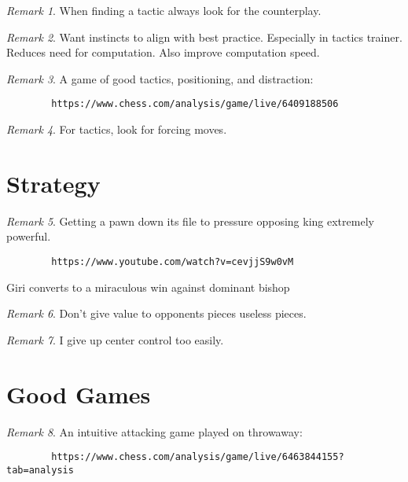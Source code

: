\documentclass[11pt]{article}
\theoremstyle{remark}
\newtheorem{remark}{Remark}
\begin{document}
\begin{remark}
	When finding a tactic always look for the counterplay.
\end{remark}

\begin{remark}
	Want instincts to align with best practice. Especially in tactics trainer. Reduces need for computation. Also improve computation speed.
\end{remark}

\begin{remark}
	A game of good tactics, positioning, and distraction: 
	\begin{verbatim}
		https://www.chess.com/analysis/game/live/6409188506
	\end{verbatim}
\end{remark}

\begin{remark}
	For tactics, look for forcing moves.
\end{remark}

\section{Strategy}

\begin{remark}
	Getting a pawn down its file to pressure opposing king extremely powerful. 
	\begin{verbatim}
		https://www.youtube.com/watch?v=cevjjS9w0vM
	\end{verbatim}
	Giri converts to a miraculous win against dominant bishop
\end{remark}

\begin{remark}
	Don't give value to opponents pieces useless pieces.
\end{remark}

\begin{remark}
	I give up center control too easily.
\end{remark}

\section{Good Games}

\begin{remark}
	An intuitive attacking game played on throwaway:
	\begin{verbatim}
		https://www.chess.com/analysis/game/live/6463844155?tab=analysis
	\end{verbatim}
\end{remark}
\end{document}
